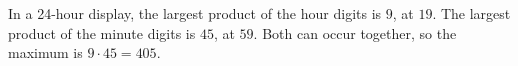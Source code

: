 In a 24-hour display, the largest product of the hour digits is $9$, at $19$. The largest product of the minute digits is $45$, at $59$. Both can occur together, so the maximum is $9\cdot45=\boxed{405}$.
